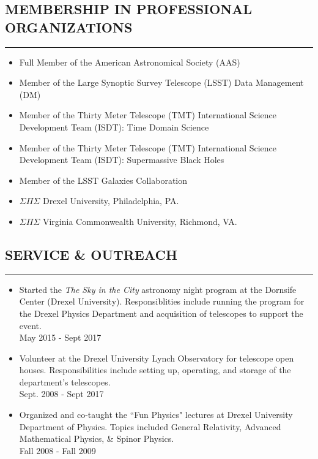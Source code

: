 \documentclass[10pt,a4]{article}
\newcounter{mySaveCounter}
\newcommand\myEnumReset{\setcounter{mySaveCounter}{0}}
\begin{document}
\subsection*{MEMBERSHIP IN PROFESSIONAL ORGANIZATIONS}
\hrule  height 4pt
\vspace{0.2cm}
\begin{itemize}
	\item Full Member of the American Astronomical Society (AAS)
	\item Member of the Large Synoptic Survey Telescope (LSST) Data Management (DM)
	\item Member of the Thirty Meter Telescope (TMT) International Science Development Team (ISDT): Time Domain Science
	\item Member of the Thirty Meter Telescope (TMT) International Science Development Team (ISDT): Supermassive Black Holes
    \item Member of the LSST Galaxies Collaboration
	\item $\Sigma \Pi \Sigma$ Drexel University, Philadelphia, PA.
	\item $\Sigma \Pi \Sigma$ Virginia Commonwealth University, Richmond, VA.
\end{itemize}
\myEnumReset

\subsection*{SERVICE \& OUTREACH}
\hrule  height 4pt
\vspace{0.2cm}
\begin{itemize}
	\item Started the \textit{The Sky in the City} astronomy night program
	at the Dornsife Center (Drexel University). Responsiblities include
	running the program for the Drexel Physics Department and acquisition
	of telescopes to support the event. \\
	May 2015 - Sept 2017
	\item Volunteer at the Drexel University Lynch Observatory for
          telescope open houses. Responsibilities include setting up,
          operating, and storage of the department's telescopes. \\
          Sept. 2008 - Sept 2017
	\item Organized and co-taught the ``Fun Physics" lectures at
	Drexel University Department of Physics. Topics included General
	Relativity, Advanced Mathematical Physics, \& Spinor Physics. \\
	Fall 2008 - Fall 2009
\end{itemize}
\myEnumReset
\end{document}
